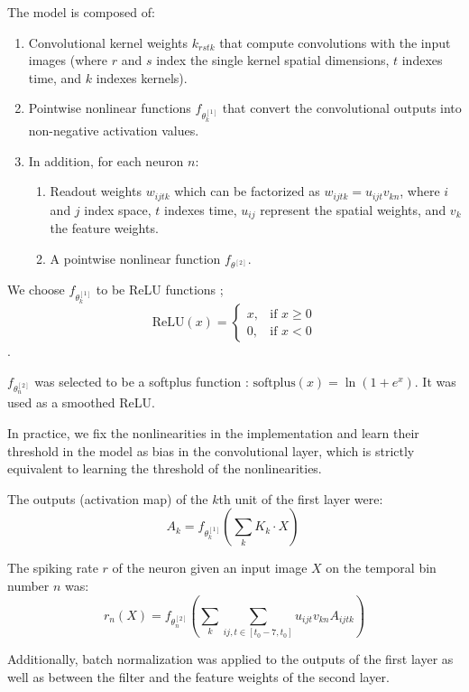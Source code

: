 The model is composed of:
\begin{enumerate}
    \item Convolutional kernel weights $k_{rstk}$ that compute convolutions
          with
          the input images (where $r$ and $s$ index the single kernel spatial
          dimensions, $t$ indexes time,
          and $k$ indexes kernels).
    \item Pointwise nonlinear functions
          $f_{\theta_k^{[1]}}$ that convert the convolutional outputs
          into non-negative activation values.
    \item In addition, for each neuron $n$:
          \begin{enumerate}
              \item Readout weights $w_{ijtk}$ which can be factorized as
                    $w_{ijtk} =
                        u_{ijt}v_{kn}$, where $i$ and $j$ index space, $t$
                    indexes time, $u_{ij}$ represent the spatial
                    weights, and $v_{k}$ the feature weights.
              \item A pointwise nonlinear function
                    $f_{\theta^{[2]}}$.
          \end{enumerate}
\end{enumerate}

We choose $f_{\theta_k^{[1]}}$ to be ReLU functions ; \[
    \text{ReLU}(x) =
    \begin{cases}
        x, & \text{if } x \geq 0 \\
        0, & \text{if } x < 0
    \end{cases}
\].

$f_{\theta_n^{[2]}}$ was selected to be a softplus function :
$\text{softplus}(x) = \ln(1 + e^x)$. It was used as a smoothed ReLU.

In practice, we fix the nonlinearities in the implementation and learn their
threshold in the model as bias in the convolutional layer, which is strictly
equivalent to learning the threshold of the nonlinearities.

The outputs (activation map) of the $k$th unit of the first layer
were:
\[
    A_k = f_{\theta_k^{[1]}} (\sum_{k} K_k \cdot X) \
\]

The spiking rate $r$ of the neuron given an input image $X$ on the temporal bin
number $n$
was:
\[
    r_n(X) = f_{\theta_n^{[2]}} (\sum_{k} \sum_{ij,t \in [t_0 - 7, t_0]}
    u_{ijt}v_{kn}A_{ijtk})
\]

Additionally, batch normalization was applied to the outputs of the first
layer as well as between the filter and the feature weights of the second
layer.

